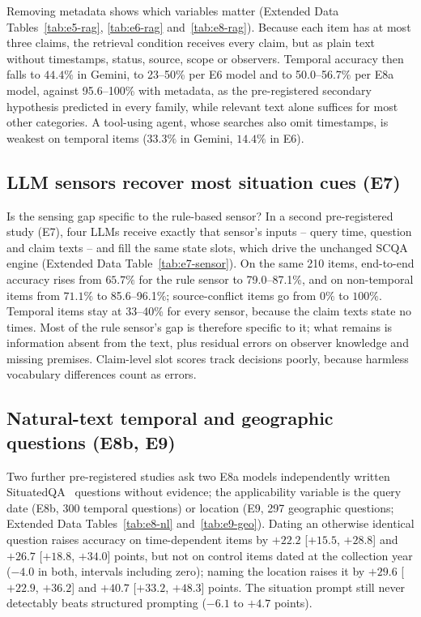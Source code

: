 Removing metadata shows which variables matter (Extended Data
Tables~\ref{tab:e5-rag}, \ref{tab:e6-rag} and~\ref{tab:e8-rag}). Because each item has at most
three claims, the retrieval condition receives every claim, but as plain text
without timestamps, status, source, scope or observers. Temporal accuracy then
falls to $44.4\%$ in Gemini, to 23--50\% per E6 model and to 50.0--56.7\% per
E8a model, against 95.6--100\%
with metadata, as the pre-registered secondary hypothesis predicted in every
family, while relevant text alone suffices for most other categories. A
tool-using agent, whose searches also omit timestamps, is weakest on temporal
items ($33.3\%$ in Gemini, $14.4\%$ in E6).

\subsection*{LLM sensors recover most situation cues (E7)}

Is the sensing gap specific to the rule-based sensor? In a second
pre-registered study (E7), four LLMs receive exactly that sensor's inputs --
query time, question and claim texts -- and fill the same state slots, which
drive the unchanged SCQA engine (Extended Data Table~\ref{tab:e7-sensor}).
On the same 210 items, end-to-end accuracy rises from $65.7\%$ for the rule
sensor to 79.0--87.1\%, and on non-temporal items from $71.1\%$ to
85.6--96.1\%; source-conflict items go from $0\%$ to $100\%$. Temporal items
stay at 33--40\% for every sensor, because the claim texts state no times.
Most of the rule sensor's gap is therefore specific to it; what remains is
information absent from the text, plus residual errors on observer knowledge
and missing premises. Claim-level slot scores track decisions poorly, because
harmless vocabulary differences count as errors.

\subsection*{Natural-text temporal and geographic questions (E8b, E9)}

Two further pre-registered studies ask two E8a models independently written
SituatedQA~\cite{zhang2021situatedqa} questions without evidence;
the applicability variable is the query date (E8b, 300 temporal questions) or
location (E9, 297 geographic questions; Extended Data
Tables~\ref{tab:e8-nl} and~\ref{tab:e9-geo}). Dating an otherwise identical
question raises accuracy on time-dependent items by $+22.2$ [$+15.5$, $+28.8$]
and $+26.7$ [$+18.8$, $+34.0$] points, but not on control items dated at the
collection year ($-4.0$ in both, intervals including zero); naming the
location raises it by $+29.6$ [$+22.9$, $+36.2$] and $+40.7$ [$+33.2$,
$+48.3$] points. The situation prompt still never detectably beats
structured prompting ($-6.1$ to $+4.7$ points).

